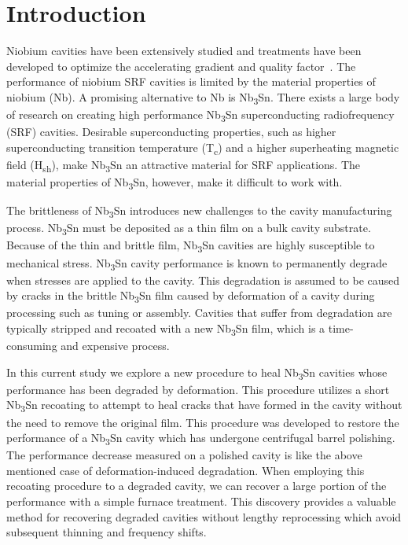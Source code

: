 \section{Introduction}
\label{sec:Introduction}

Niobium cavities have been extensively studied and treatments have been developed to optimize the accelerating gradient and quality factor~\cite{10.1063/1.4866013, 10.1063/1.4960801, 10.1063/5.0059464, 10.1063/5.0063379}. The performance of niobium SRF cavities is limited by the material properties of niobium (Nb). A promising alternative to Nb is Nb\textsubscript{3}Sn. There exists a large body of research on creating high performance Nb\textsubscript{3}Sn superconducting radiofrequency (SRF) cavities\cite{10.1063/1.4913617, 10.1063/1.4913247}. Desirable superconducting properties, such as higher superconducting transition temperature (T\textsubscript{c}) and a higher superheating magnetic field (H\textsubscript{sh})\cite{liarte2017theoretical, catelani2008temperature, lin2012effect, kubo2020superfluid}, make Nb\textsubscript{3}Sn an attractive material for SRF applications. The material properties of Nb\textsubscript{3}Sn, however, make it difficult to work with. 

The brittleness of Nb\textsubscript{3}Sn introduces new challenges to the cavity manufacturing process. Nb\textsubscript{3}Sn must be deposited as a thin film on a bulk cavity substrate\cite{posen2017nb3sn, pudasaini2019growth, porter2018update}. Because of the thin and brittle film, Nb\textsubscript{3}Sn cavities are highly susceptible to mechanical stress. Nb\textsubscript{3}Sn cavity performance is known to permanently degrade when stresses are applied to the cavity\cite{eremeev2023preservation, eremeev:srf2019-mop015}. This degradation is assumed to be caused by cracks in the brittle Nb\textsubscript{3}Sn film caused by deformation of a cavity during processing such as tuning or assembly. Cavities that suffer from degradation are typically stripped and recoated with a new Nb\textsubscript{3}Sn film, which is a time-consuming and expensive process.

In this current study we explore a new procedure to heal Nb\textsubscript{3}Sn cavities whose performance has been degraded by deformation. This procedure utilizes a short Nb\textsubscript{3}Sn recoating to attempt to heal cracks that have formed in the cavity without the need to remove the original film. This procedure was developed to restore the performance of a Nb\textsubscript{3}Sn cavity which has undergone centrifugal barrel polishing\cite{viklund2024improving}. The performance decrease measured on a polished cavity is like the above mentioned case of deformation-induced degradation. When employing this recoating procedure to a degraded cavity, we can recover a large portion of the performance with a simple furnace treatment. This discovery provides a valuable method for recovering degraded cavities without lengthy reprocessing which avoid subsequent thinning and frequency shifts.


